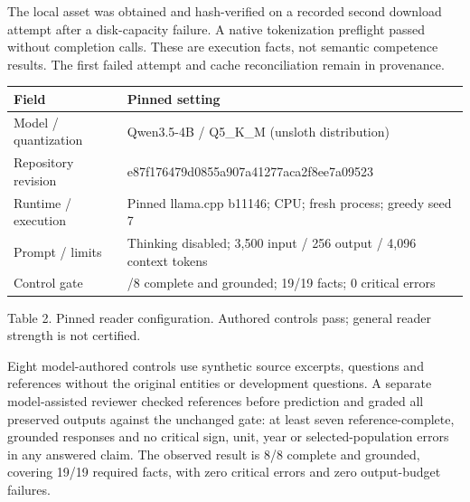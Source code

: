 \documentclass[11pt]{article}
\begin{document}
The local asset was obtained and hash-verified on a recorded second download attempt after a disk-capacity failure. A native tokenization preflight passed without completion calls. These are execution facts, not semantic competence results. The first failed attempt and cache reconciliation remain in provenance.


{\small

\begin{longtable}{>{\raggedright\arraybackslash}p{}>{\raggedright\arraybackslash}p{}}

\toprule

\textbf{Field} & \textbf{Pinned setting} \\

\midrule\endhead

Model / quantization & Qwen3.5-4B / Q5\_K\_M (unsloth distribution) \\

Repository revision & e87f176479d0855a907a41277aca2f8ee7a09523 \\

Runtime / execution & Pinned llama.cpp b11146; CPU; fresh process; greedy seed 7 \\

Prompt / limits & Thinking disabled; 3,500 input / 256 output / 4,096 context tokens \\

Control gate & 8/8 complete and grounded; 19/19 facts; 0 critical errors \\

\bottomrule

\end{longtable}

}

{\small Table 2. Pinned reader configuration. Authored controls pass; general reader strength is not certified.}

Eight model-authored controls use synthetic source excerpts, questions and references without the original entities or development questions. A separate model-assisted reviewer checked references before prediction and graded all preserved outputs against the unchanged gate: at least seven reference-complete, grounded responses and no critical sign, unit, year or selected-population errors in any answered claim. The observed result is 8/8 complete and grounded, covering 19/19 required facts, with zero critical errors and zero output-budget failures.
\end{document}

